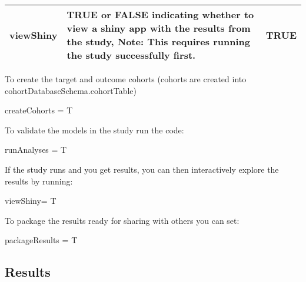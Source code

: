 \documentclass[
]{article}
\newenvironment{Shaded}{\begin{snugshade}}{\end{snugshade}}
\newcommand{\NormalTok}[1]{#1}
\newcommand{\StringTok}[1]{\textcolor[rgb]{0.31,0.60,0.02}{#1}}
\begin{document}
\begin{longtable}[]{@{}lll@{}}
\begin{minipage}[t]{0.21\columnwidth}
viewShiny\strut
\end{minipage} & \begin{minipage}[t]{0.46\columnwidth}\raggedright
TRUE or FALSE indicating whether to view a shiny app with the results
from the study, Note: This requires running the study successfully
first.\strut
\end{minipage} & \begin{minipage}[t]{0.24\columnwidth}\raggedright
TRUE\strut
\end{minipage}\tabularnewline
\bottomrule
\end{longtable}

To create the target and outcome cohorts (cohorts are created into
cohortDatabaseSchema.cohortTable)

\begin{Shaded}
\begin{Highlighting}[]
\NormalTok{    createCohorts =}\StringTok{ }\NormalTok{T}
\end{Highlighting}
\end{Shaded}

To validate the models in the study run the code:

\begin{Shaded}
\begin{Highlighting}[]
\NormalTok{    runAnalyses =}\StringTok{ }\NormalTok{T}
\end{Highlighting}
\end{Shaded}

If the study runs and you get results, you can then interactively
explore the results by running:

\begin{Shaded}
\begin{Highlighting}[]
\NormalTok{    viewShiny=}\StringTok{ }\NormalTok{T}
\end{Highlighting}
\end{Shaded}

To package the results ready for sharing with others you can set:

\begin{Shaded}
\begin{Highlighting}[]
\NormalTok{    packageResults =}\StringTok{ }\NormalTok{T}
\end{Highlighting}
\end{Shaded}

\hypertarget{results}{%
\subsection{Results}\label{results}}
\end{document}
